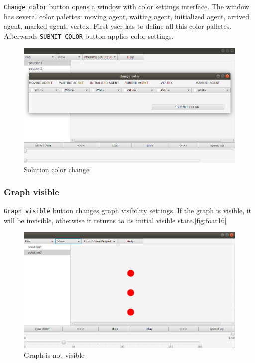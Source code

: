 \documentclass[thesis=B,english]{FITthesis}[2019/12/23]
\begin{document}
\verb|Change color| button opens a window with color settings interface. The window  
has several color\label{fig:float15} palettes: moving agent, waiting agent, initialized agent, arrived agent, marked agent, vertex. First yser has to define all this color palletes. Afterwards \verb|SUBMIT COLOR| button applies color settings.   

\begin{figure}
	\includegraphics[scale=0.34]{solutioncolorchange.png}
	\caption[Solution color change]{Solution color change}\label{fig:float15}
\end{figure}

\subsubsection{Graph visible}

\verb|Graph visible| button changes graph visibility settings. If the graph is visible, it will be invisible, otherwise it returns to its initial visible state.\ref{fig:foat16}

\begin{figure}
	\includegraphics[scale=0.34]{not-visiblegraph.png}
	\caption[Not visible graph]{Graph is not visible}\label{fig:float16}
\end{figure}
\end{document}
